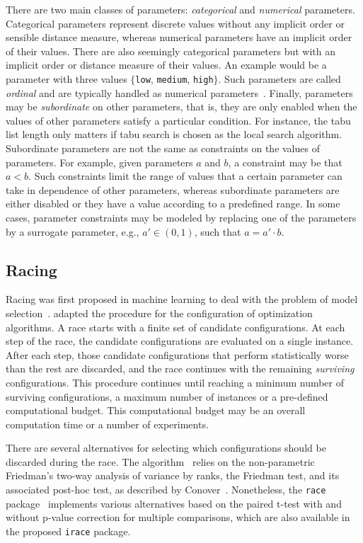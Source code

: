 \documentclass[a4paper]{article}
\newcommand{\eg}{e.g.}%
\newcommand{\FRACE}{\text{F-Race}\xspace}
\begin{document}
There are two main classes of  parameters:
\emph{categorical} and \emph{numerical} parameters. Categorical
parameters represent discrete values without any implicit order or
sensible distance measure, whereas numerical parameters have an
implicit order of their values. There are also seemingly categorical
parameters but with an implicit order or distance measure of their
values. An example would be a parameter with three values
$\{$\texttt{low}, \texttt{medium}, \texttt{high}$\}$. Such parameters
are called \emph{ordinal} and are typically handled as numerical
parameters~\citep{BirYuaBal2010:emaoa}. Finally, parameters may be
\emph{subordinate} on other parameters, that is, they are only enabled
when the values of other parameters satisfy a particular
condition. For instance, the tabu list length only matters if tabu search is chosen as the local search algorithm. Subordinate parameters are not the same as
constraints on the values of parameters.  For example, given
parameters $a$ and $b$, a constraint may be that $a < b$. Such
constraints limit the range of values that a certain parameter can
take in dependence of other parameters, whereas subordinate parameters
are either disabled or they have a value according to a predefined
range. In some cases, parameter constraints may be modeled by
replacing one of the parameters by a surrogate parameter, \eg{}, $a'
\in (0,1)$, such that $ a = a' \cdot b$.


\subsection{Racing}

Racing was first proposed in machine learning to deal with the problem
of model selection~\citep{MarMoo1997air}. 
\citet{Birattari09tuning} adapted the procedure for the configuration
of optimization algorithms. A race starts with a finite set of
candidate configurations. At each step of the race, the candidate
configurations are evaluated on a single instance. After each step,
those candidate configurations that perform statistically worse than
the rest are discarded, and the race continues with the remaining
\emph{surviving} configurations. This procedure continues until
reaching a minimum number of surviving configurations, a maximum
number of instances or a pre-defined computational budget. This
computational budget may be an overall computation time or a number of
experiments.

There are several alternatives for selecting which configurations
should be discarded during the race. The \FRACE
algorithm~\citep{Birattari09tuning,BirStuPaqVar02:gecco} relies on the
non-parametric Friedman's two-way analysis of variance by ranks, the
Friedman test, and its associated post-hoc test, as described by
Conover~\citep{Conover99:pns}. Nonetheless, the \texttt{race}
package~\citep{IRIDIA-2003-037} implements various alternatives based
on the paired t-test with and without p-value correction for multiple
comparisons, which are also available in the proposed \texttt{irace}
package.
\end{document}
